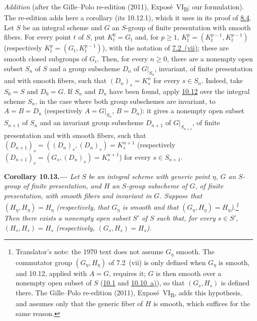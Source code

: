 \par\medskip\noindent
\emph{Addition} (after the Gille--Polo re-edition (2011), Expos\'e~VI\textsubscript{B}; our formulation).
The re-edition adds here a corollary (its 10.12.1), which it uses in its proof of
\hyperref[prop:sga3-VIB-8.4]{8.4}. Let \(S\) be an integral scheme and \(G\) an \(S\)-group of finite
presentation with smooth fibers. For every point \(t\) of \(S\), put \(K^0_t=G_t\) and, for \(p\geq1\),
\(K^p_t=(K^{p-1}_t,K^{p-1}_t)\) \textup{(}respectively \(K^p_t=(G_t,K^{p-1}_t)\)\textup{)}, with the notation of
\hyperref[def:sga3-VIB-7.2-vii]{7.2~(vii)}; these are smooth closed subgroups of \(G_t\). Then, for every
\(n\geq0\), there are a nonempty open subset \(S_n\) of \(S\) and a group subscheme \(D_n\) of \(G|_{S_n}\),
invariant, of finite presentation and with smooth fibers, such that \((D_n)_s=K^n_s\) for every \(s\in S_n\).
Indeed, take \(S_0=S\) and \(D_0=G\). If \(S_n\) and \(D_n\) have been found, apply
\hyperref[prop:sga3-VIB-10.12]{10.12} over the integral scheme \(S_n\), in the case where both group subschemes
are invariant, to \(A=B=D_n\) \textup{(}respectively \(A=G|_{S_n}\), \(B=D_n\)\textup{)}: it gives a nonempty
open subset \(S_{n+1}\) of \(S_n\) and an invariant group subscheme \(D_{n+1}\) of \(G|_{S_{n+1}}\), of finite
presentation and with smooth fibers, such that \((D_{n+1})_s=((D_n)_s,(D_n)_s)=K^{n+1}_s\)
\textup{(}respectively \((D_{n+1})_s=(G_s,(D_n)_s)=K^{n+1}_s\)\textup{)} for every \(s\in S_{n+1}\).

\medskip
{}\label{cor:sga3-VIB-10.13}%
\noindent\textbf{Corollary 10.13.---}
\begingroup\itshape
Let \(S\) be an integral scheme with generic point \(\eta\), \(G\) an
\(S\)-group of finite presentation, and \(H\) an \(S\)-group subscheme of
\(G\), of finite presentation, with smooth fibers and invariant in \(G\).
Suppose that \((H_\eta,H_\eta)=H_\eta\) \textup{(}respectively, that
\(G_\eta\) is smooth and that \((G_\eta,H_\eta)=H_\eta\)\textup{)}.\footnote{Translator's
note: the 1970 text does not assume \(G_\eta\) smooth. The commutator group \((G_\eta,H_\eta)\) of 7.2~(vii) is only
defined when \(G_\eta\) is smooth, and 10.12, applied with \(A=G\), requires it; \(G\) is then smooth over a nonempty
open subset of \(S\) (\hyperref[par:sga3-VIB-10.1]{10.1} and \hyperref[par:sga3-VIB-10.10-a]{10.10~a)}), so that
\((G_s,H_s)\) is defined there. The Gille--Polo re-edition (2011), Expos\'e~VI\textsubscript{B}, adds this hypothesis,
and assumes only that the generic fiber of \(H\) is smooth, which suffices for the same reason.} Then there exists a
nonempty open subset \(S'\) of \(S\) such that, for every \(s\in S'\), \((H_s,H_s)=H_s\) \textup{(}respectively,
\((G_s,H_s)=H_s\)\textup{)}.
\par\endgroup

